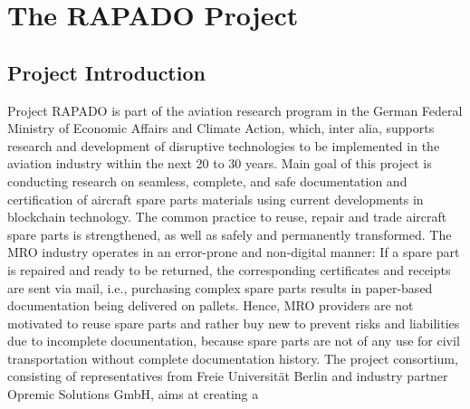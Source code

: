 \chapter{The RAPADO Project}
\section{Project Introduction}
Project RAPADO is part of the aviation research program in the German Federal Ministry of Economic Affairs and Climate Action, which, inter alia, supports research and development of disruptive technologies to be implemented in the aviation industry within the next 20 to 30 years. Main goal of this project is conducting research on seamless, complete, and safe documentation and certification of aircraft spare parts materials using current developments in blockchain technology. The common practice to reuse, repair and trade aircraft spare parts is strengthened, as well as safely and permanently transformed. The MRO industry operates in an error-prone and non-digital manner: If a spare part is repaired and ready to be returned, the corresponding certificates and receipts are sent via mail, i.e., purchasing complex spare parts results in paper-based documentation being delivered on pallets. Hence, MRO providers are not motivated to reuse spare parts and rather buy new to prevent risks and liabilities due to incomplete documentation, because spare parts are not of any use for civil transportation without complete documentation history. The project consortium, consisting of representatives from Freie Universit{\"a}t Berlin and industry partner Opremic Solutions GmbH, aims at creating a
